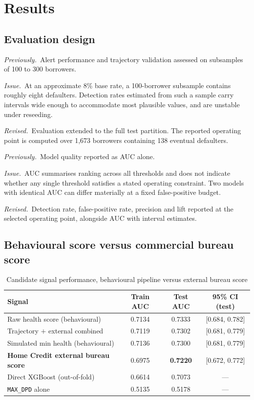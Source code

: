 \documentclass[11pt,a4paper]{article}
\newcommand{\designnote}[3]{%
  \par\vspace{7pt}
  \begin{list}{}{%
    \setlength{\leftmargin}{2em}\setlength{\rightmargin}{1em}%
    \setlength{\labelwidth}{0pt}\setlength{\labelsep}{0pt}%
    \setlength{\itemsep}{2pt}\setlength{\topsep}{0pt}%
    \setlength{\parsep}{0pt}}
    \item[]\textit{Previously.}~#1
    \item[]\textit{Issue.}~#2
    \item[]\textit{Revised.}~#3
  \end{list}
  \par\vspace{7pt}
}
\begin{document}
\section{Results}

\subsection{Evaluation design}

\designnote{Alert performance and trajectory validation assessed on subsamples of 100 to
300 borrowers.}
{At an approximate 8\% base rate, a 100-borrower subsample contains roughly eight
defaulters. Detection rates estimated from such a sample carry intervals wide enough to
accommodate most plausible values, and are unstable under reseeding.}
{Evaluation extended to the full test partition. The reported operating point is computed
over 1,673 borrowers containing 138 eventual defaulters.}

\designnote{Model quality reported as AUC alone.}
{AUC summarises ranking across all thresholds and does not indicate whether any single
threshold satisfies a stated operating constraint. Two models with identical AUC can
differ materially at a fixed false-positive budget.}
{Detection rate, false-positive rate, precision and lift reported at the selected
operating point, alongside AUC with interval estimates.}

\subsection{Behavioural score versus commercial bureau score}

\begin{table}[H]
\centering
\caption{Candidate signal performance, behavioural pipeline versus external bureau score}
\begin{tabular}{lccc}
\toprule
\textbf{Signal} & \textbf{Train AUC} & \textbf{Test AUC} & \textbf{95\% CI (test)} \\
\midrule
Raw health score (behavioural) & 0.7134 & 0.7333 & [0.684, 0.782] \\
Trajectory $+$ external combined & 0.7119 & 0.7302 & [0.681, 0.779] \\
Simulated min health (behavioural) & 0.7136 & 0.7300 & [0.681, 0.779] \\
\textbf{Home Credit external bureau score} & 0.6975 & \textbf{0.7220} & [0.672, 0.772] \\
Direct XGBoost (out-of-fold) & 0.6614 & 0.7073 & --- \\
\texttt{MAX\_DPD} alone & 0.5135 & 0.5178 & --- \\
\bottomrule
\end{tabular}
\end{table}
\end{document}
